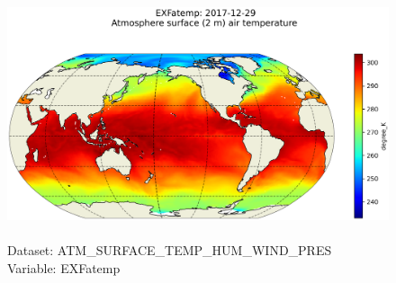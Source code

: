 \begin{figure}[H]
\centering
\includegraphics[scale=0.5]{../images/plots/latlon_plots/Atmosphere_Surface_Temperature_Humidity_Wind_and_Pressure/EXFatemp.png}
\caption{\\Dataset: ATM\_SURFACE\_TEMP\_HUM\_WIND\_PRES\\Variable: EXFatemp}
\label{tab:table-ATM_SURFACE_TEMP_HUM_WIND_PRES_EXFatemp-Plot}
\end{figure}
\pagebreak

